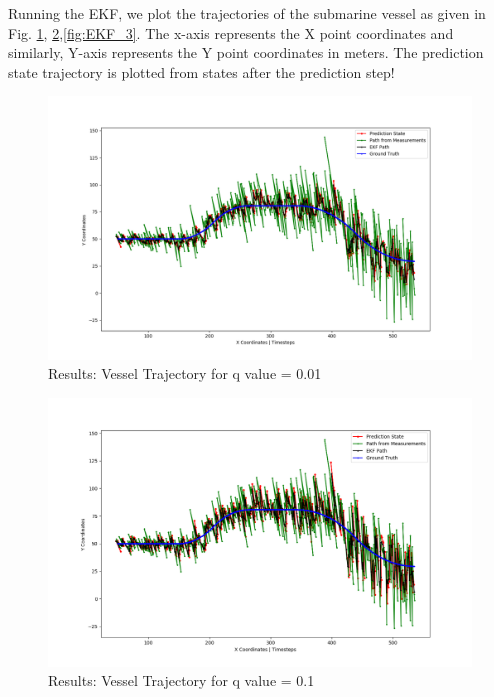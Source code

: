 \documentclass[12pt]{article}
\begin{document}
Running the EKF, we plot the trajectories of the submarine vessel as given in Fig. \ref{fig:EKF_1}, \ref{fig:EKF_2},\ref{fig:EKF_3}. The x-axis represents the X point coordinates and similarly,  Y-axis represents the Y point coordinates in meters. The prediction state trajectory is plotted from states after the prediction step!

  \begin{figure}[!h]
\centering
\includegraphics[width=\textwidth]{../results/path_q0_01.png}
\caption{Results: Vessel Trajectory for q value = 0.01}
\label{fig:EKF_1}
\end{figure}

\begin{figure}[]
\centering
\includegraphics[width=\textwidth]{../results/path_q0_1.png}
\caption{Results: Vessel Trajectory for q value = 0.1}
\label{fig:EKF_2}
\end{figure}
\end{document}
